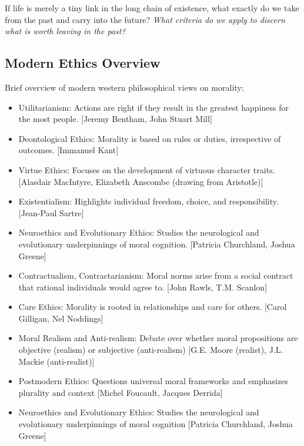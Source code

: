 \documentclass[11pt,a4]{article}
\begin{document}
    \par
    If life is merely a tiny link in the long chain of
    existence, what exactly do we take from the past
    and carry into the future? \textit{What criteria
    do we apply to discern what is worth leaving in the past?}

    \subsection{Modern Ethics Overview}

        Brief overview of modern western philosophical views on morality:

        \begin{itemize}
            \item Utilitarianism: Actions are right if they result in the
            greatest happiness for the most people. [Jeremy Bentham, John Stuart Mill]

            \item Deontological Ethics: Morality is based on rules or duties, irrespective of outcomes. [Immanuel Kant]
            \item Virtue Ethics: Focuses on the development of virtuous character traits. [Alasdair MacIntyre, Elizabeth Anscombe (drawing from Aristotle)]
            \item Existentialism: Highlights individual freedom, choice, and responsibility. [Jean-Paul Sartre]
            \item Neuroethics and Evolutionary Ethics:  Studies the neurological and evolutionary underpinnings of moral cognition. [Patricia Churchland, Joshua Greene]
            \item Contractualism, Contractarianism: Moral norms arise from a social contract that rational individuals
                  would agree to. [John Rawls, T.M. Scanlon]


            \item Care Ethics: Morality is rooted in relationships and care for others.
                [Carol Gilligan, Nel Noddings]

            \item Moral Realism and Anti-realism:
                 Debate over whether moral propositions are objective (realism)
                or subjective (anti-realism)
                [G.E. Moore (realist), J.L. Mackie (anti-realist)]

            \item Postmodern Ethics:
                 Questions universal moral frameworks and emphasizes plurality and context
                [Michel Foucault, Jacques Derrida]

            \item Neuroethics and Evolutionary Ethics:
                Studies the neurological and evolutionary underpinnings of moral cognition
                [Patricia Churchland, Joshua Greene]


        \end{itemize}
\end{document}
